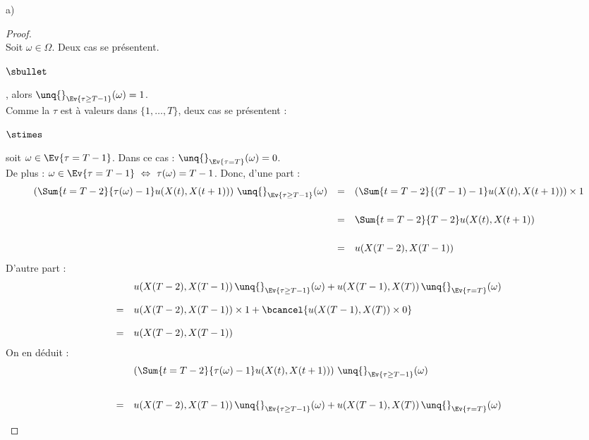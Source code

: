 \begin{noliste}{a)}
    \begin{proof}~\\
      Soit $\omega \in \Omega$. Deux cas se présentent.
      \begin{noliste}{$\sbullet$}
        \item {}, alors
        $\unq{}_{\Ev{\tau \geq T-1}}(\omega)=1$.\\[.1cm]
        Comme la \var $\tau$ est à valeurs dans $\{1, \ldots , T\}$, 
        deux cas se présentent :
        \begin{noliste}{$\stimes$}
	  \item soit $\omega \in \Ev{\tau = T-1}$. Dans ce cas : 
	  $\unq{}_{\Ev{\tau = T}}(\omega)=0$.\\
	  De plus : $\omega \in \Ev{\tau = T-1} \ \Leftrightarrow \
	  \tau(\omega) = T-1$. Donc, d'une part :
	  \[
	    \begin{array}{rcl}
	      \left(\Sum{t=T-2}{\tau(\omega)-1} u(X(t),X(t+1))\right)
	      \, \unq{}_{\Ev{\tau \geq T-1}}(\omega) 
	      &=&
	      \left(\Sum{t=T-2}{(T-1)-1} u(X(t),X(t+1))\right)
	      \times 1
	      \\[.6cm]
	      &=& \Sum{t=T-2}{T-2} u(X(t),X(t+1))
	      \\[.6cm]
	      &=& u(X(T-2),X(T-1))
	    \end{array}
	  \]
	  D'autre part :
	  \[
	    \begin{array}{cl}
	      & u(X(T-2),X(T-1)) \, \unq{}_{\Ev{\tau \geq T-1}}
	      (\omega) + u(X(T-1),X(T)) \, \unq{}_{\Ev{\tau =T}}
	      (\omega)
	      \\[.4cm]
	      =& u(X(T-2),X(T-1)) \times 1 + \bcancel{u(X(T-1),X(T))
	      \times 0}
	      \\[.4cm]
	      =& u(X(T-2),X(T-1))
	    \end{array}
	  \]
	  On en déduit :
	  \[
	    \begin{array}{cl}
	      & \left( \Sum{t=T-2}{\tau(\omega)-1} 
	      u(X(t),X(t+1))\right)   \,
	      \unq{}_{\Ev{\tau \geq T-1}}(\omega)
	      \\[.8cm]
	      =& u(X(T-2),X(T-1)) \, \unq{}_{\Ev{\tau \geq T-1}}(\omega)
	      + u(X(T-1),X(T)) \, \unq{}_{\Ev{\tau =T}}(\omega)
	    \end{array}
	  \]
	  

\end{noliste}
\end{noliste}
\end{proof}
\end{noliste}
